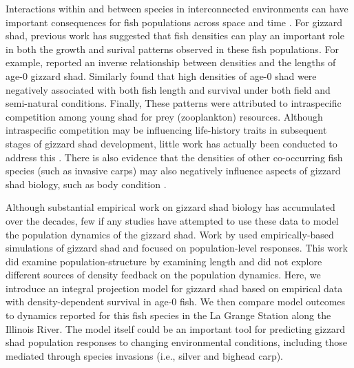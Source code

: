 \documentclass[preprint,review,12pt,authoryear]{elsarticle}
\begin{document}
Interactions within and between species in interconnected environments can have important consequences for fish populations across space and time \citep{thorp2006riverine}.  
For gizzard shad, previous work has suggested that fish densities can play an important role in both the growth and surival patterns observed in these fish populations.  
For example, \citep{buynak1992differential} reported an inverse relationship between densities and the lengths of age-0 gizzard shad.  Similarly \citep{welker1994growth} found that high densities of age-0 shad were negatively associated with both fish length and survival under both field and semi-natural conditions. Finally, %
These patterns were attributed to intraspecific competition among young shad for prey (zooplankton) resources. Although intraspecific competition may be influencing life-history traits in subsequent stages of gizzard shad development, little work has actually been conducted to address this \citep{dicenzo1996relations}. 
There is also evidence that the densities of other co-occurring fish species (such as invasive carps) may also negatively influence aspects of gizzard shad biology, such as body condition \citep{irons2007reduced,love2018does}.

Although substantial empirical work on gizzard shad biology has accumulated over the decades, few if any studies have attempted to use these data to model the population dynamics of the gizzard shad.
Work by \citet{catalano2010size, catalano2011whole} used empirically-based simulations of gizzard shad and focused on population-level responses.
This work did examine population-structure by examining length and did
not explore different sources of density feedback on the population
dynamics.
Here, we introduce an integral projection model for gizzard shad based on empirical data with density-dependent survival in age-0 fish.
We then compare model outcomes to dynamics reported for this fish species in the La Grange Station along the Illinois River.
The model itself could be an important tool for predicting gizzard shad population responses to changing environmental conditions, including those mediated through species invasions (i.e., silver and bighead carp).
\end{document}
